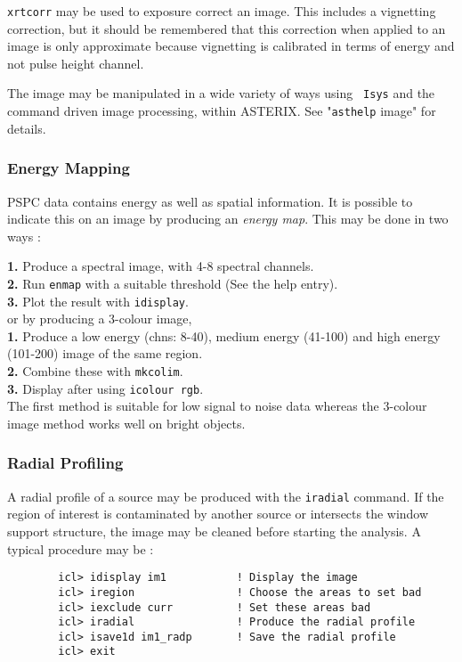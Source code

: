 \documentclass[11pt,fleqn]{article}    %
\begin{document}
{\tt xrtcorr} may be used to exposure correct an image. This includes a vignetting
correction, but it should be remembered that this correction
when applied to an image is only approximate because 
vignetting is calibrated in terms of energy and not pulse height channel.

The image may be manipulated in a wide variety of ways using {\tt
Isys} and the command driven image processing, within ASTERIX. 
See "{\tt asthelp} image" for details.

\subsubsection{Energy Mapping}
PSPC data contains energy as well as spatial information. It is possible
to indicate this on an image by producing an {\em energy map}. This may
be done in two ways :

{\bf 1.} Produce a spectral image, with 4-8 spectral channels. \\
{\bf 2.} Run {\tt enmap} with a suitable threshold (See the help entry). \\
{\bf 3.} Plot the result with {\tt idisplay}. \\

or by producing a 3-colour image, \\

{\bf 1.} Produce a low energy (chns: 8-40), medium energy (41-100) 
and high energy (101-200) image of the same region. \\
{\bf 2.} Combine these with {\tt mkcolim}. \\
{\bf 3.} Display after using {\tt icolour rgb}. \\

The first method is suitable for low signal to noise data whereas the 
3-colour image method works well on bright objects.

\subsubsection{Radial Profiling}
A radial profile of a source may be produced with the {\tt iradial}
command. If the region of interest is contaminated by another source
or intersects the window support structure, the image may be cleaned 
before starting the analysis. A typical procedure may be :

\begin{verbatim}
        icl> idisplay im1           ! Display the image 
        icl> iregion                ! Choose the areas to set bad 
        icl> iexclude curr          ! Set these areas bad 
        icl> iradial                ! Produce the radial profile
        icl> isave1d im1_radp       ! Save the radial profile 
        icl> exit
\end{verbatim}
\end{document}
